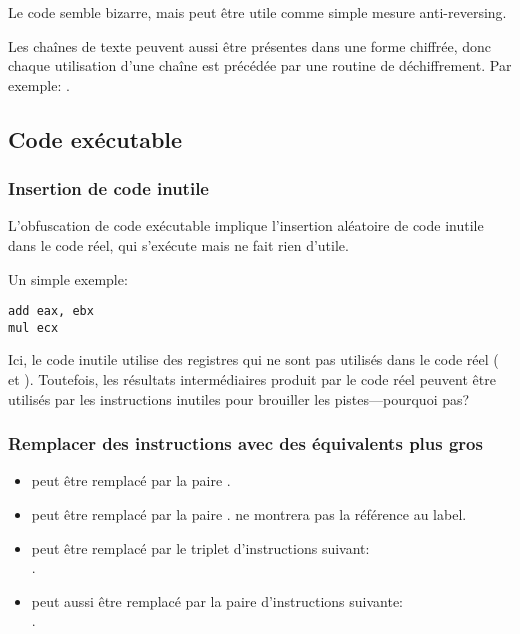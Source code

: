 Le code semble bizarre, mais peut être utile comme simple mesure anti-reversing.

Les chaînes de texte peuvent aussi être présentes dans une forme chiffrée, donc chaque
utilisation d'une chaîne est précédée par une routine de déchiffrement.
Par exemple: .

\subsection{Code exécutable}

\subsubsection{Insertion de code inutile}

L'obfuscation de code exécutable implique l'insertion aléatoire de code inutile
dans le code réel, qui s'exécute mais ne fait rien d'utile.

Un simple exemple:

\begin{lstlisting}[caption=code original,style=customasmx86]
add	eax, ebx
mul	ecx
\end{lstlisting}



Ici, le code inutile utilise des registres qui ne sont pas utilisés dans le code
réel ( et ).
Toutefois, les résultats intermédiaires produit par le code réel peuvent être utilisés
par les instructions inutiles pour brouiller les pistes---pourquoi pas?

\subsubsection{Remplacer des instructions avec des équivalents plus gros}

\begin{itemize}
\item {} peut être remplacé par la paire .
\item {} peut être remplacé par la paire . 
\IDA{} ne montrera pas la référence au label.
\item {} peut être remplacé par le triplet d'instructions suivant:\\
.
\item {} peut aussi être remplacé par la paire d'instructions suivante:\\
.%

\end{itemize}

